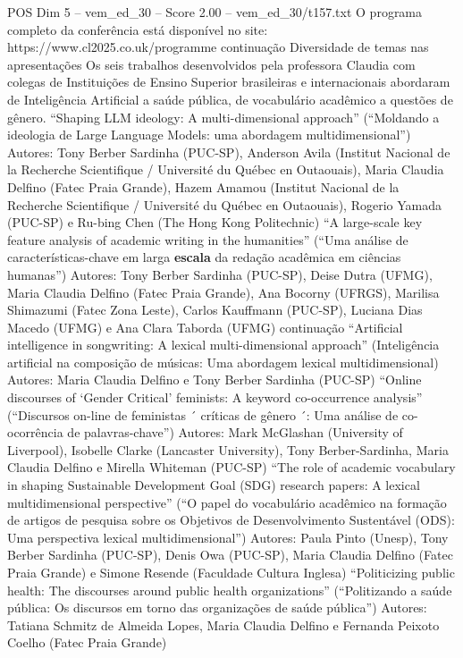 \begin{textsample}{POS Dim 5 – vem\_ed\_30 – Score 2.00 – vem\_ed\_30/t157.txt}
O programa completo da conferência está disponível no site: https://www.cl2025.co.uk/programme continuação Diversidade de temas nas apresentações Os seis trabalhos desenvolvidos pela professora Claudia com colegas de Instituições de Ensino Superior brasileiras e internacionais abordaram de Inteligência Artificial a saúde pública, de vocabulário acadêmico a questões de gênero. “Shaping LLM ideology: A multi-dimensional approach” (“Moldando a ideologia de Large Language Models: uma abordagem multidimensional”) Autores: Tony Berber Sardinha (PUC-SP), Anderson Avila (Institut Nacional de la Recherche Scientifique / Université du Québec en Outaouais), Maria Claudia Delfino (Fatec Praia Grande), Hazem Amamou (Institut Nacional de la Recherche Scientifique / Université du Québec en Outaouais), Rogerio Yamada (PUC-SP) e Ru-bing Chen (The Hong Kong Politechnic) “A large-scale key feature analysis of academic writing in the humanities” (“Uma análise de características-chave em larga \textbf{escala} da redação acadêmica em ciências humanas”) Autores: Tony Berber Sardinha (PUC-SP), Deise Dutra (UFMG), Maria Claudia Delfino (Fatec Praia Grande), Ana Bocorny (UFRGS), Marilisa Shimazumi (Fatec Zona Leste), Carlos Kauffmann (PUC-SP), Luciana Dias Macedo (UFMG) e Ana Clara Taborda (UFMG) continuação “Artificial intelligence in songwriting: A lexical multi-dimensional approach” (Inteligência artificial na composição de músicas: Uma abordagem lexical multidimensional) Autores: Maria Claudia Delfino e Tony Berber Sardinha (PUC-SP) “Online discourses of ‘Gender Critical’ feminists: A keyword co-occurrence analysis” (“Discursos on-line de feministas ´ críticas de gênero ´: Uma análise de co-ocorrência de palavras-chave”) Autores: Mark McGlashan (University of Liverpool), Isobelle Clarke (Lancaster University), Tony Berber-Sardinha, Maria Claudia Delfino e Mirella Whiteman (PUC-SP) “The role of academic vocabulary in shaping Sustainable Development Goal (SDG) research papers: A lexical multidimensional perspective” (“O papel do vocabulário acadêmico na formação de artigos de pesquisa sobre os Objetivos de Desenvolvimento Sustentável (ODS): Uma perspectiva lexical multidimensional”) Autores: Paula Pinto (Unesp), Tony Berber Sardinha (PUC-SP), Denis Owa (PUC-SP), Maria Claudia Delfino (Fatec Praia Grande) e Simone Resende (Faculdade Cultura Inglesa) “Politicizing public health: The discourses around public health organizations” (“Politizando a saúde pública: Os discursos em torno das organizações de saúde pública”) Autores: Tatiana Schmitz de Almeida Lopes, Maria Claudia Delfino e Fernanda Peixoto Coelho (Fatec Praia Grande)

\end{textsample}
